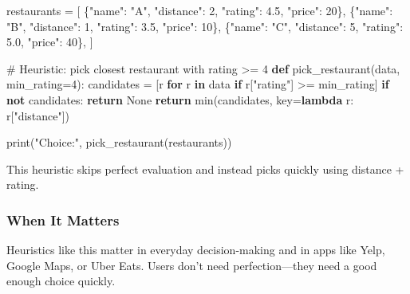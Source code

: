 \documentclass[
  letterpaper,
  DIV=11,
  numbers=noendperiod]{scrreprt}
\newenvironment{Shaded}{\begin{snugshade}}{\end{snugshade}}
\newcommand{\BuiltInTok}[1]{\textcolor[rgb]{0.00,0.23,0.31}{#1}}
\newcommand{\CommentTok}[1]{\textcolor[rgb]{0.37,0.37,0.37}{#1}}
\newcommand{\ControlFlowTok}[1]{\textcolor[rgb]{0.00,0.23,0.31}{\textbf{#1}}}
\newcommand{\DecValTok}[1]{\textcolor[rgb]{0.68,0.00,0.00}{#1}}
\newcommand{\FloatTok}[1]{\textcolor[rgb]{0.68,0.00,0.00}{#1}}
\newcommand{\KeywordTok}[1]{\textcolor[rgb]{0.00,0.23,0.31}{\textbf{#1}}}
\newcommand{\NormalTok}[1]{\textcolor[rgb]{0.00,0.23,0.31}{#1}}
\newcommand{\OperatorTok}[1]{\textcolor[rgb]{0.37,0.37,0.37}{#1}}
\newcommand{\StringTok}[1]{\textcolor[rgb]{0.13,0.47,0.30}{#1}}
\newcommand{\VariableTok}[1]{\textcolor[rgb]{0.07,0.07,0.07}{#1}}
\begin{document}
\begin{Shaded}
\begin{Highlighting}[]
\NormalTok{restaurants }\OperatorTok{=}\NormalTok{ [}
\NormalTok{    \{}\StringTok{"name"}\NormalTok{: }\StringTok{"A"}\NormalTok{, }\StringTok{"distance"}\NormalTok{: }\DecValTok{2}\NormalTok{, }\StringTok{"rating"}\NormalTok{: }\FloatTok{4.5}\NormalTok{, }\StringTok{"price"}\NormalTok{: }\DecValTok{20}\NormalTok{\},}
\NormalTok{    \{}\StringTok{"name"}\NormalTok{: }\StringTok{"B"}\NormalTok{, }\StringTok{"distance"}\NormalTok{: }\DecValTok{1}\NormalTok{, }\StringTok{"rating"}\NormalTok{: }\FloatTok{3.5}\NormalTok{, }\StringTok{"price"}\NormalTok{: }\DecValTok{10}\NormalTok{\},}
\NormalTok{    \{}\StringTok{"name"}\NormalTok{: }\StringTok{"C"}\NormalTok{, }\StringTok{"distance"}\NormalTok{: }\DecValTok{5}\NormalTok{, }\StringTok{"rating"}\NormalTok{: }\FloatTok{5.0}\NormalTok{, }\StringTok{"price"}\NormalTok{: }\DecValTok{40}\NormalTok{\},}
\NormalTok{]}

\CommentTok{\# Heuristic: pick closest restaurant with rating \textgreater{}= 4}
\KeywordTok{def}\NormalTok{ pick\_restaurant(data, min\_rating}\OperatorTok{=}\DecValTok{4}\NormalTok{):}
\NormalTok{    candidates }\OperatorTok{=}\NormalTok{ [r }\ControlFlowTok{for}\NormalTok{ r }\KeywordTok{in}\NormalTok{ data }\ControlFlowTok{if}\NormalTok{ r[}\StringTok{"rating"}\NormalTok{] }\OperatorTok{\textgreater{}=}\NormalTok{ min\_rating]}
    \ControlFlowTok{if} \KeywordTok{not}\NormalTok{ candidates:}
        \ControlFlowTok{return} \VariableTok{None}
    \ControlFlowTok{return} \BuiltInTok{min}\NormalTok{(candidates, key}\OperatorTok{=}\KeywordTok{lambda}\NormalTok{ r: r[}\StringTok{"distance"}\NormalTok{])}

\BuiltInTok{print}\NormalTok{(}\StringTok{"Choice:"}\NormalTok{, pick\_restaurant(restaurants))}
\end{Highlighting}
\end{Shaded}

This heuristic skips perfect evaluation and instead picks quickly using
distance + rating.

\subsubsection{When It Matters}\label{when-it-matters-88}

Heuristics like this matter in everyday decision-making and in apps like
Yelp, Google Maps, or Uber Eats. Users don't need perfection---they need
a good enough choice quickly.
\end{document}

